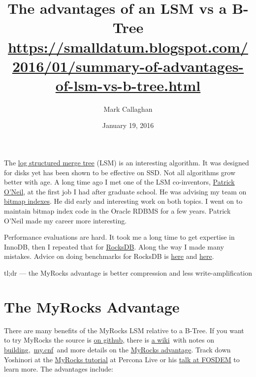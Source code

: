 \documentclass[a4paper,12pt,notitlepage,twoside,openright]{article}
\title{The advantages of an LSM vs a B-Tree\\{\footnotesize \url{https://smalldatum.blogspot.com/2016/01/summary-of-advantages-of-lsm-vs-b-tree.html}}}
\author{Mark Callaghan }
\date{January 19, 2016}
\begin{document}
\maketitle

The \href{https://en.wikipedia.org/wiki/Log-structured_merge-tree}{log
structured merge tree} (LSM) is an interesting algorithm. It was
designed for disks yet has been shown to be effective on SSD. Not all
algorithms grow better with age. A long time ago I met one of the LSM
co-inventors, \href{http://www.cs.umb.edu/~poneil/}{Patrick O'Neil}, at
the first job I had after graduate school. He was advising my team on
\href{https://en.wikipedia.org/wiki/Bitmap_index}{bitmap indexes}. He
did early and interesting work on both topics. I went on to maintain
bitmap index code in the Oracle RDBMS for a few years. Patrick O'Neil
made my career more interesting.

Performance evaluations are hard. It took me a long time to get
expertise in InnoDB, then I repeated that for
\href{http://rocksdb.org/}{RocksDB}. Along the way I made many mistakes.
Advice on doing benchmarks for RocksDB is
\href{http://smalldatum.blogspot.com/2014/07/benchmarking-leveldb-family.html}{here}
and
\href{http://smalldatum.blogspot.com/2015/04/comparing-leveldb-and-rocksdb-take-2.html}{here}.

tl;dr --- the MyRocks advantage is better compression and less
write-amplification

\hypertarget{the-myrocks-advantage}{%
\section{The MyRocks Advantage}\label{the-myrocks-advantage}}

There are many benefits of the MyRocks LSM relative to a B-Tree. If you
want to try MyRocks the source is
\href{https://github.com/facebook/mysql-5.6}{on github}, there is
\href{https://github.com/facebook/mysql-5.6/wiki}{a wiki}~with notes on
\href{https://github.com/facebook/mysql-5.6/wiki/Getting-Started-with-MyRocks}{building},~\href{https://github.com/facebook/mysql-5.6/wiki/my.cnf-tuning}{my.cnf}~and
more details on the
\href{https://github.com/facebook/mysql-5.6/wiki/MyRocks-advantages-over-InnoDB}{MyRocks
advantage}. Track down Yoshinori at the
\href{https://www.percona.com/live/data-performance-conference-2016/sessions/myrocks-deep-dive-flash-optimized-lsm-database-mysql-and-its-use-case-facebook}{MyRocks
tutorial} at Percona Live or his
\href{https://fosdem.org/2016/schedule/event/facebook/}{talk at FOSDEM}
to learn more. The advantages include:
\end{document}
